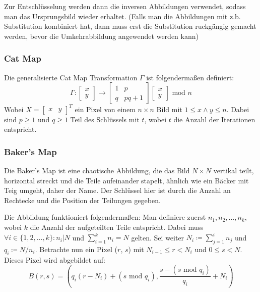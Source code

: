 Zur Entschlüsselung werden dann die inversen Abbildungen verwendet, sodass man das Ursprungsbild wieder erhaltet. (Falls man die Abbildungen
mit z.b. Substitution kombiniert hat, dann muss erst die Substitution ruckgängig gemacht werden, bevor die Umkehrabbildung angewendet werden kann)

\subsubsection{Cat Map}
Die generalisierte Cat Map Transformation $\Gamma$ ist folgendermaßen definiert:
$$
	\Gamma:
	\begin{bmatrix} x \\ y \end{bmatrix} \rightarrow
	\begin{bmatrix} 1 & p \\ q & pq + 1 \end{bmatrix}
	\begin{bmatrix} x \\ y \end{bmatrix} \text{ mod } n
$$
Wobei $X = \begin{bmatrix} x & y \end{bmatrix}^T$ ein Pixel von einem $n \times n$ Bild mit $1 \leq x \land y \leq n$.
Dabei sind $p \geq 1$ und $q \geq 1$ Teil des Schlüssels mit $t$, wobei $t$ die Anzahl der Iterationen entspricht. \cite{chaos}

\subsubsection{Baker's Map}\label{sec:bakersmap}
Die Baker's Map ist eine chaotische Abbildung, die das Bild $N \times N$ vertikal teilt, horizontal streckt und die Teile aufeinander stapelt, ähnlich
wie ein Bäcker mit Teig umgeht, daher der Name. Der Schlüssel hier ist durch die Anzahl an Rechtecke und die Position der Teilungen gegeben. \cite{chaos}

Die Abbildung funktioniert folgendermaßen: Man definiere zuerst $n_1, n_2, \dots , n_k$, wobei $k$ die Anzahl der aufgeteilten Teile entspricht.
Dabei muss $\forall i \in \{1, 2, \dots, k\} : n_i | N$ und $\sum_{i = 1}^{k} n_i = N$ gelten. Sei weiter $N_i \coloneq \sum_{j = 1}^{i} n_j$ und $q_i \coloneq N/n_i$.
Betrachte nun ein Pixel ($r$, $s$) mit $N_{i - 1} \leq r < N_i$ und $0 \leq s < N$. Dieses Pixel wird abgebildet auf: \cite{fridrich97}
$$B(r, s) =  (q_i(r - N_i) + (s \text{ mod } q_i), \frac{s - (s \text{ mod } q_i)}{q_i} + N_i)$$

